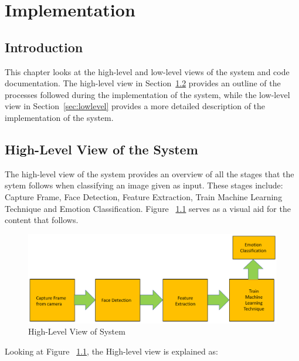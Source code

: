 \chapter{Implementation} %
%


\section{Introduction} %
This chapter looks at the high-level and low-level views of the system and
code documentation. The high-level view in Section~\ref{sec:highlevel} provides an outline
of the processes followed during the implementation of the system, while
the low-level view in Section~\ref{sec:lowlevel} provides a more detailed description of
the implementation of the system.   

\section{High-Level View of the System}\label{sec:highlevel}
The high-level view of the system provides an overview of all the stages that the sytem follows when classifying an image given as input. These stages include: Capture Frame, Face Detection, Feature Extraction, Train Machine Learning Technique and Emotion Classification. Figure ~\ref{fig: highlevel} serves as a visual aid for the content that follows.
\begin{figure}[H]
  \centering
  \includegraphics[scale=0.2]{pres1}
  \caption{High-Level View of System}
  \label{fig: highlevel}
\end{figure} 
Looking at Figure ~\ref{fig: highlevel}, the High-level view is explained as:

